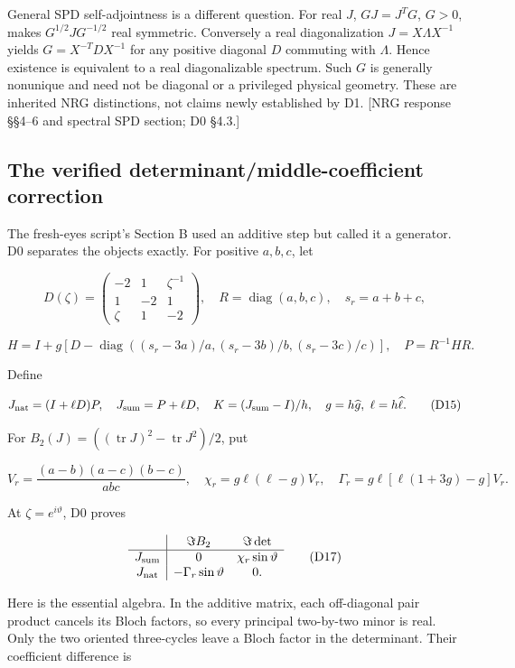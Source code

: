 \documentclass[11pt,a4paper]{article}
\begin{document}
General SPD self-adjointness is a different question. For real \(J\), \(GJ=J^TG\), \(G>0\), makes \(G^{1/2}JG^{-1/2}\) real symmetric. Conversely a real diagonalization \(J=X\Lambda X^{-1}\) yields \(G=X^{-T}DX^{-1}\) for any positive diagonal \(D\) commuting with \(\Lambda\). Hence existence is equivalent to a real diagonalizable spectrum. Such \(G\) is generally nonunique and need not be diagonal or a privileged physical geometry. These are inherited NRG distinctions, not claims newly established by D1. [NRG response \S{}\S{}4--6 and spectral SPD section; D0 \S{}4.3.]

\subsection{The verified determinant/\allowbreak{}middle-coefficient correction}

The fresh-eyes script's Section B used an additive step but called it a generator. D0 separates the objects exactly. For positive \(a,b,c\), let

\[
D(\zeta)=\begin{pmatrix}-2&1&\zeta^{-1}\\1&-2&1\\\zeta&1&-2\end{pmatrix},
\quad R=\operatorname{diag}(a,b,c),\quad s_r=a+b+c,
\]

\[
H=I+g[D-\operatorname{diag}((s_r-3a)/a,(s_r-3b)/b,(s_r-3c)/c)],
\quad P=R^{-1}HR.
\]

Define

\[
J_{\rm nat}=(I+\ell D)P,\quad J_{\rm sum}=P+\ell D,\quad
K=(J_{\rm sum}-I)/h,\quad g=h\widehat g,\ \ell=h\widehat\ell.
\tag{D15}\label{eq:D15}
\]

For \(B_2(J)=((\operatorname{tr}J)^2-\operatorname{tr}J^2)/2\), put

\[
V_r=\frac{(a-b)(a-c)(b-c)}{abc},\quad
\chi_r=g\ell(\ell-g)V_r,\quad
\Gamma_r=g\ell[\ell(1+3g)-g]V_r.
\tag{D16}\label{eq:D16}
\]

At \(\zeta=e^{i\vartheta}\), D0 proves

\[
\begin{array}{c|cc}
 & \Im B_2 & \Im\det\\ \hline
J_{\rm sum}&0&\chi_r\sin\vartheta\\
J_{\rm nat}&-\Gamma_r\sin\vartheta&0 .
\end{array}
\tag{D17}\label{eq:D17}
\]

Here is the essential algebra. In the additive matrix, each off-diagonal pair product cancels its Bloch factors, so every principal two-by-two minor is real. Only the two oriented three-cycles leave a Bloch factor in the determinant. Their coefficient difference is
\end{document}
